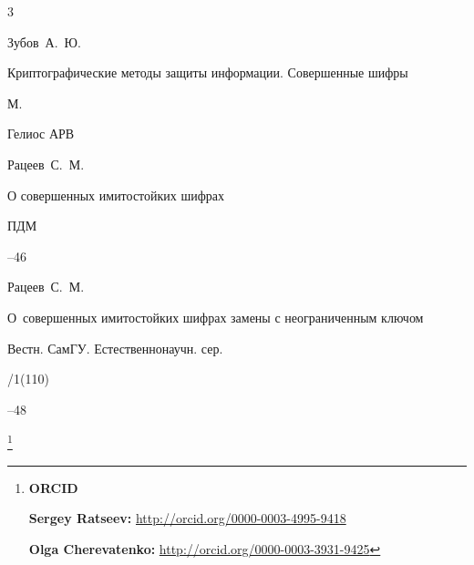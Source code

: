 \begin{thebibliography}{3}

\by Зубов~А.~Ю.

\book Криптографические методы защиты информации. Совершенные шифры

\publaddr М.

\publ Гелиос АРВ







\by    Рацеев~С.~М.

\paper О совершенных имитостойких шифрах

\jour ПДМ



--46






\by    Рацеев~С.~М.

\paper О~совершенных имитостойких шифрах замены с неограниченным ключом

\jour Вестн. СамГУ. Естественнонаучн. сер.


/1(110)

--48





\end{thebibliography}







\RuDate	






\bigskip



\makeentitle





\thanks{{\bf ORCID}



{\bf Sergey Ratseev:} \url{http://orcid.org/0000-0003-4995-9418}



{\bf Olga Cherevatenko:} \url{http://orcid.org/0000-0003-3931-9425}

}





